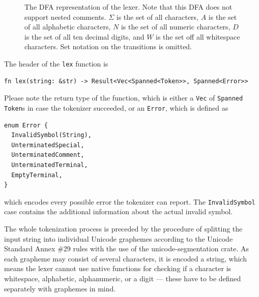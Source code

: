 \documentclass[english,bachelors,forcepolishlogotype]{wizthesis}
\begin{document}
\begin{figure}[H]
{
  }
  \caption{The DFA representation of the lexer. Note that this DFA does not
  support nested comments. $\Sigma$ is the set of all characters, $A$ is the set
  of all alphabetic characters, $N$ is the set of all numeric characters, $D$ is
  the set of all ten decimal digits, and $W$ is the set off all whitespace
  characters. Set notation on the transitions is omitted.}
  \label{fig:lexer-dfa}
\end{figure}

The header of the \texttt{lex} function is
\begin{verbatim}
fn lex(string: &str) -> Result<Vec<Spanned<Token>>, Spanned<Error>>
\end{verbatim}
Please note the return type of the function, which is either a \texttt{Vec} of
\texttt{Spanned} \texttt{Token}s in case the tokenizer succeeded, or an
\texttt{Error}, which is defined as
\begin{listing}[H]
  \begin{verbatim}
enum Error {
  InvalidSymbol(String),
  UnterminatedSpecial,
  UnterminatedComment,
  UnterminatedTerminal,
  EmptyTerminal,
}
  \end{verbatim}
\end{listing}
\noindent which encodes every possible error the tokenizer can report. The
\texttt{InvalidSymbol} case contains the additional information about the actual
invalid symbol.

The whole tokenization process is preceded by the procedure of splitting the
input string into individual Unicode graphemes according to the Unicode Standard
Annex \#29 \cite{unicode-standard-annex-29} rules with the use of the
unicode-segmentation crate. As each grapheme may consist of several characters,
it is encoded a string, which means the lexer cannot use native functions for
checking if a character is whitespace, alphabetic, alphanumeric, or a digit ---
these have to be defined separately with graphemes in mind.
\end{document}
